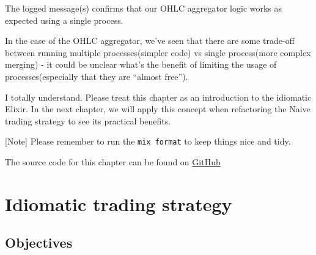 \documentclass[
  oneside]{book}
\newenvironment{Shaded}{\begin{snugshade}}{\end{snugshade}}
\newcommand{\AttributeTok}[1]{\textcolor[rgb]{0.13,0.29,0.53}{#1}}
\newcommand{\ErrorTok}[1]{\textcolor[rgb]{0.64,0.00,0.00}{\textbf{#1}}}
\newcommand{\ExtensionTok}[1]{#1}
\newcommand{\KeywordTok}[1]{\textcolor[rgb]{0.13,0.29,0.53}{\textbf{#1}}}
\newcommand{\NormalTok}[1]{#1}
\newcommand{\OperatorTok}[1]{\textcolor[rgb]{0.81,0.36,0.00}{\textbf{#1}}}
\newcommand{\PreprocessorTok}[1]{\textcolor[rgb]{0.56,0.35,0.01}{\textit{#1}}}
\newcommand{\SpecialStringTok}[1]{\textcolor[rgb]{0.31,0.60,0.02}{#1}}
\newcommand{\StringTok}[1]{\textcolor[rgb]{0.31,0.60,0.02}{#1}}
\begin{document}
\begin{Shaded}
\end{Shaded}

The logged message(s) confirms that our OHLC aggregator logic works as expected using a single process.

In the case of the OHLC aggregator, we've seen that there are some trade-off between running multiple processes(simpler code) vs single process(more complex merging) - it could be unclear what's the benefit of limiting the usage of processes(especially that they are ``almost free'').

I totally understand. Please treat this chapter as an introduction to the idiomatic Elixir. In the next chapter, we will apply this concept when refactoring the Naive trading strategy to see its practical benefits.

{[}Note{]} Please remember to run the \texttt{mix\ format} to keep things nice and tidy.

The source code for this chapter can be found on \href{https://github.com/Cinderella-Man/hands-on-elixir-and-otp-cryptocurrency-trading-bot-source-code/tree/chapter_19}{GitHub}

\chapter{Idiomatic trading strategy}\label{idiomatic-trading-strategy}

\section{Objectives}\label{objectives-19}
\end{document}
